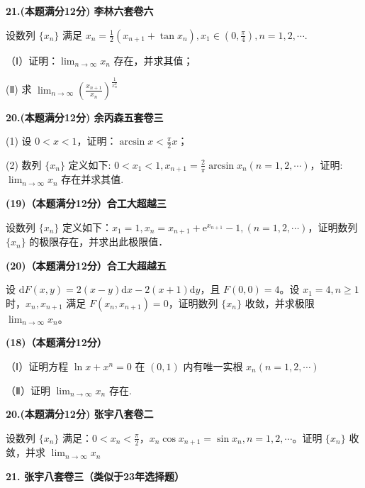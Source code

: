 \documentclass[a4paper,12pt]{article}
\begin{document}
\textbf{21.(本题满分12分) 李林六套卷六}

设数列 $\{x_{n}\}$ 满足 $x_{n}=\frac{1}{2}(x_{n+1}+\tan x_{n}),x_{1}\in\left(0,\frac{\pi}{4}\right),n=1,2,\cdots.$

（Ⅰ）证明：$\lim_{n\to\infty}x_{n}$ 存在，并求其值；

(Ⅱ) 求 $\lim_{n\to\infty}\left(\frac{x_{n+1}}{x_{n}}\right)^{\frac{1}{x_{n}^{2}}}$

\vspace{0.5cm}

\textbf{20.(本题满分12分) 余丙森五套卷三}

(1) 设 $0 < x < 1$，证明：$\arcsin x < \frac{\pi}{2}x$；

(2) 数列 $\{x_{n}\}$ 定义如下: $0 < x_{1} < 1, x_{n+1} = \frac{2}{\pi} \arcsin x_{n} (n = 1, 2, \cdots)$，证明: $\lim_{n \to \infty} x_{n}$ 存在并求其值.

\vspace{0.5cm}

\textbf{(19)（本题满分12分）合工大超越三}

设数列 $\{x_{n}\}$ 定义如下：$x_{1}=1, x_{n}=x_{n+1}+\mathrm{e}^{x_{n+1}}-1, (n=1,2,\cdots)$，证明数列 $\{x_{n}\}$ 的极限存在，并求出此极限值．

\vspace{0.5cm}

\textbf{(20)（本题满分12分）合工大超越五}

设 $\mathrm{d}F(x,y)=2(x-y)\mathrm{d}x-2(x+1)\mathrm{d}y$，且 $F(0,0)=4$。设 $x_{1}=4,n\geqslant1$ 时，$x_{n},x_{n+1}$ 满足 $F(x_{n},x_{n+1})=0$，证明数列 $\{x_{n}\}$ 收敛，并求极限 $\lim_{n\to\infty}x_{n}$。

\vspace{0.5cm}

\textbf{(18)（本题满分12分）}

（Ⅰ）证明方程 $\ln x + x^{n} = 0$ 在 $(0,1)$ 内有唯一实根 $x_{n}(n = 1,2,\cdots)$

（Ⅱ）证明 $\lim_{n\to\infty}x_n$ 存在.

\vspace{0.5cm}

\textbf{20.(本题满分12分) 张宇八套卷二}

设数列 $\{x_{n}\}$ 满足：$0<x_{n}<\frac{\pi}{2}$，$x_{n}\cos x_{n+1}=\sin x_{n},n=1,2,\cdots$。证明 $\{x_{n}\}$ 收敛，并求 $\lim_{n\to\infty}x_{n}$

\vspace{0.5cm}

\textbf{21. 张宇八套卷三（类似于23年选择题）}
\end{document}
